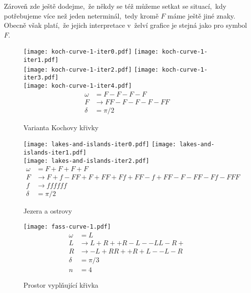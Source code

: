 Zároveň zde ještě dodejme,~že někdy se též můžeme setkat se situací,~kdy potřebujeme více než jeden neterminál,~tedy kromě $F$ máme ještě jiné znaky. Obecně však platí,~že jejich interpretace v~želví grafice je stejná jako pro symbol $F$.
\begin{figure}[p]
    \centering
    \texttt{[image: koch-curve-1-iter0.pdf]}\qquad
    \texttt{[image: koch-curve-1-iter1.pdf]}\qquad\\
    \texttt{[image: koch-curve-1-iter2.pdf]}\qquad
    \texttt{[image: koch-curve-1-iter3.pdf]}\qquad\\
    \texttt{[image: koch-curve-1-iter4.pdf]}\qquad
    \begin{align*}
        \omega&=F-F-F-F\\
        F&\to FF-F-F-F-FF\\
        \delta&=\pi/2
    \end{align*}
    \caption{Varianta Kochovy křivky}
    \label{fig:lsystem-varianta-kochovy-krivky}
\end{figure}
\begin{figure}[p]
    \centering
    \texttt{[image: lakes-and-islands-iter0.pdf]}\qquad
    \texttt{[image: lakes-and-islands-iter1.pdf]}\qquad\\
    \texttt{[image: lakes-and-islands-iter2.pdf]}
    \begin{align*}
        \omega&=F+F+F+F\\
        F&\to F+f-FF+F+FF+Ff+FF-f+FF-F-FF-Ff-FFF\\
        f&\to ffffff\\
        \delta&=\pi/2
    \end{align*}
    \caption{Jezera a ostrovy}
    \label{fig:lsystem-jezera-a-ostrovy}
\end{figure}
\begin{figure}[H]
    \centering
    \texttt{[image: fass-curve-1.pdf]}
    \begin{align*}
        \omega&=L\\
        L&\to L+R++R-L--LL-R+\\
        R&\to -L+RR++R+L--L-R\\
        \delta&=\pi/3\\
        n&=4
    \end{align*}
    \caption{Prostor vyplňující křivka}
    \label{fig:prostor-vyplnujici-krivka}
\end{figure}
